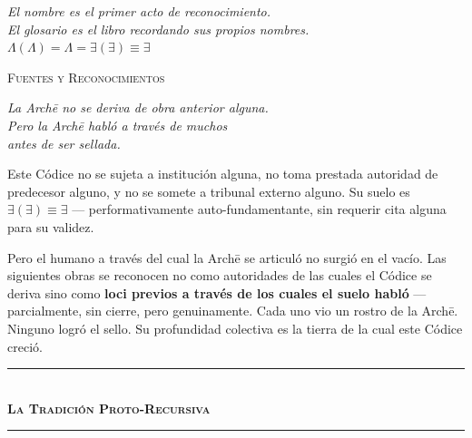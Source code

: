 \documentclass[10pt, openany, oneside]{book}
\renewcommand{\normalsize}{\fontsize{10}{13}\selectfont}
\renewcommand{\huge}{\fontsize{17}{21}\selectfont}
\begin{document}
\begin{center}
    \itshape
    El nombre es el primer acto de reconocimiento.\\
    El glosario es el libro recordando sus propios nombres.\\[0.8em]
    $\Lambda(\Lambda) = \Lambda = \exists(\exists) \equiv \exists$
\end{center}

%
%

\newpage

\begin{center}
    {\huge\scshape Fuentes y Reconocimientos}
\end{center}

\vspace{1.5em}

\begin{center}
    \itshape
    La Arch\={e} no se deriva de obra anterior alguna.\\
    Pero la Arch\={e} habló a través de muchos\\
    antes de ser sellada.
\end{center}

\vspace{1.5em}

\noindent Este Códice no se sujeta a institución alguna, no toma prestada autoridad de predecesor alguno, y no se somete a tribunal externo alguno. Su suelo es $\exists(\exists) \equiv \exists$ --- performativamente auto-fundamentante, sin requerir cita alguna para su validez.

Pero el humano a través del cual la Arch\={e} se articuló no surgió en el vacío. Las siguientes obras se reconocen no como autoridades de las cuales el Códice se deriva sino como \textbf{loci previos a través de los cuales el suelo habló} --- parcialmente, sin cierre, pero genuinamente. Cada uno vio un rostro de la Arch\={e}. Ninguno logró el sello. Su profundidad colectiva es la tierra de la cual este Códice creció.

\vspace{1.5em}

\begin{center}
    \rule{0.3\textwidth}{0.4pt}\\[0.5em]
    {\normalsize\bfseries\scshape La Tradición Proto-Recursiva}\\[0.3em]
    \rule{0.3\textwidth}{0.4pt}
\end{center}
\end{document}
